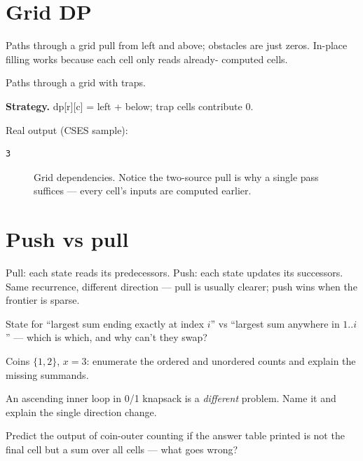 \section{Grid DP}\label{sec:griddp}
Paths through a grid pull from left and above; obstacles are just
zeros. In-place filling works because each cell only reads already-
computed cells.
\begin{example}\label{ex:grid}
Paths through a grid with traps.
\par\smallskip
\textbf{Strategy.} dp[r][c] = left + below; trap cells contribute 0.
\par\smallskip
\begin{solution}

Real output (CSES sample):
\begin{lstlisting}[numbers=none]
3
\end{lstlisting}
\end{solution}
\end{example}
\begin{figure}[ht]\centering

\caption{Grid dependencies. Notice the two-source pull is why a
single pass suffices --- every cell's inputs are computed earlier.}
\label{fig:griddep}
\end{figure}

\section{Push vs pull}\label{sec:pushpull}
Pull: each state reads its predecessors. Push: each state updates its
successors. Same recurrence, different direction --- pull is usually
clearer; push wins when the frontier is sparse.

\begin{exercise}[easy]\label{exr:state}
State for ``largest sum ending exactly at index $i$'' vs ``largest
sum anywhere in $1..i$'' --- which is which, and why can't they swap?
\end{exercise}
\begin{exercise}[medium]\label{exr:ord}
Coins $\{1,2\}$, $x=3$: enumerate the ordered and unordered counts
and explain the missing summands.
\end{exercise}
\begin{exercise}[medium]\label{exr:dir}
An ascending inner loop in 0/1 knapsack is a \emph{different}
problem. Name it and explain the single direction change.
\end{exercise}
\begin{exercise}[medium]\label{exr:predbug}
Predict the output of coin-outer counting if the answer table
printed is not the final cell but a sum over all cells --- what goes
wrong?
\end{exercise}

